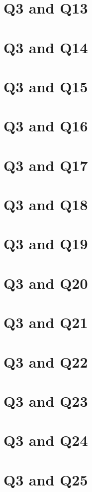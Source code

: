 \documentclass{report}
\begin{document}
\section{Q3 and Q13}\clearpage
\section{Q3 and Q14}\clearpage
\section{Q3 and Q15}\clearpage
\section{Q3 and Q16}\clearpage
\section{Q3 and Q17}\clearpage
\section{Q3 and Q18}\clearpage
\section{Q3 and Q19}\clearpage
\section{Q3 and Q20}\clearpage
\section{Q3 and Q21}\clearpage
\section{Q3 and Q22}\clearpage
\section{Q3 and Q23}\clearpage
\section{Q3 and Q24}\clearpage
\section{Q3 and Q25}\clearpage
\end{document}
